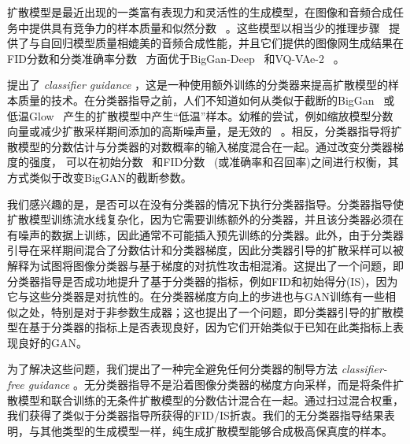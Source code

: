 \documentclass{article}
\begin{document}
扩散模型是最近出现的一类富有表现力和灵活性的生成模型，在图像和音频合成任务中提供具有竞争力的样本质量和似然分数~ \citep{sohl2015deep,song2019generative,ho2020denoising,song2020score,kingma2021variational,song2021maximum} 。这些模型以相当少的推理步骤~ \citep{chen2020wavegrad,kong2020diffwave} 提供了与自回归模型质量相媲美的音频合成性能，并且它们提供的图像网生成结果在FID分数和分类准确率分数~ \citep{ho2021cascaded,dhariwal2021diffusion} 方面优于BigGan-Deep~ \citep{brock2018large} 和VQ-VAe-2~ \citep{razavi2019generating} 。


 \citet{dhariwal2021diffusion} 提出了 \emph{classifier guidance} ，这是一种使用额外训练的分类器来提高扩散模型的样本质量的技术。在分类器指导之前，人们不知道如何从类似于截断的BigGan~ \citep{brock2018large} 或低温Glow~ \citep{kingma2018glow} 产生的扩散模型中产生“低温”样本。幼稚的尝试，例如缩放模型分数向量或减少扩散采样期间添加的高斯噪声量，是无效的~ \citep{dhariwal2021diffusion} 。相反，分类器指导将扩散模型的分数估计与分类器的对数概率的输入梯度混合在一起。通过改变分类器梯度的强度， \citeauthor{dhariwal2021diffusion} 可以在初始分数~ \citep{salimans2016improved} 和FID分数~ \citep{heusel2017gans} (或准确率和召回率)之间进行权衡，其方式类似于改变BigGAN的截断参数。


我们感兴趣的是，是否可以在没有分类器的情况下执行分类器指导。分类器指导使扩散模型训练流水线复杂化，因为它需要训练额外的分类器，并且该分类器必须在有噪声的数据上训练，因此通常不可能插入预先训练的分类器。此外，由于分类器引导在采样期间混合了分数估计和分类器梯度，因此分类器引导的扩散采样可以被解释为试图将图像分类器与基于梯度的对抗性攻击相混淆。这提出了一个问题，即分类器指导是否成功地提升了基于分类器的指标，例如FID和初始得分(IS)，因为它与这些分类器是对抗性的。在分类器梯度方向上的步进也与GAN训练有一些相似之处，特别是对于非参数生成器；这也提出了一个问题，即分类器引导的扩散模型在基于分类器的指标上是否表现良好，因为它们开始类似于已知在此类指标上表现良好的GAN。


为了解决这些问题，我们提出了一种完全避免任何分类器的制导方法 \emph{classifier-free guidance} 。无分类器指导不是沿着图像分类器的梯度方向采样，而是将条件扩散模型和联合训练的无条件扩散模型的分数估计混合在一起。通过扫过混合权重，我们获得了类似于分类器指导所获得的FID/IS折衷。我们的无分类器指导结果表明，与其他类型的生成模型一样，纯生成扩散模型能够合成极高保真度的样本。
\end{document}
